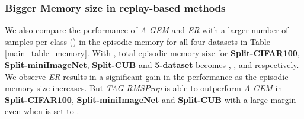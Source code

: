 \documentclass{article} \usepackage{collas2022_conference,times}
\begin{document}
\subsubsection{Bigger Memory size in replay-based methods}\label{agem_er_app}
    We also compare the performance of \textit{A-GEM} and \textit{ER} with a larger number of samples per class () in the episodic memory for all four datasets in Table \ref{main_table_memory}. With , total episodic memory size for \textbf{Split-CIFAR100}, \textbf{Split-miniImageNet}, \textbf{Split-CUB} and \textbf{5-dataset} becomes , ,  and  respectively. We observe \textit{ER} results in a significant gain in the performance as the episodic memory size increases. But \textit{TAG-RMSProp} is able to outperform \textit{A-GEM} in \textbf{Split-CIFAR100}, \textbf{Split-miniImageNet} and \textbf{Split-CUB} with a large margin even when  is set to .  
\end{document}
